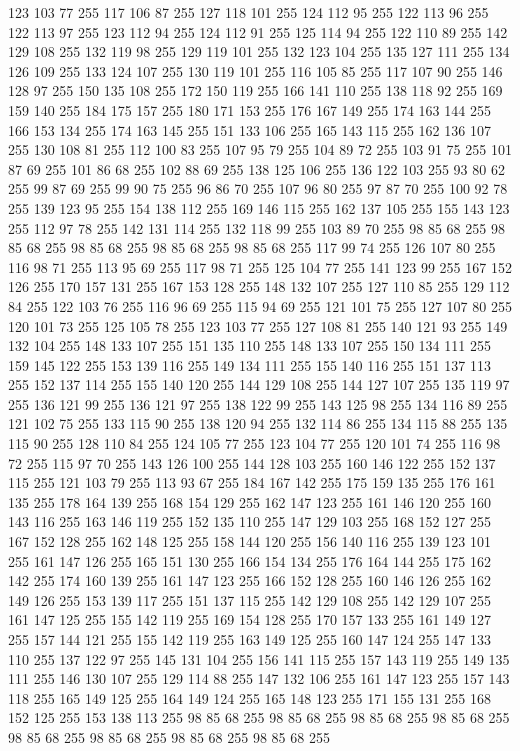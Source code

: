 123 103 77 255 117 106 87 255 127 118 101 255 124 112 95 255 122 113 96 255 122 113 97 255 123 112 94 255 124 112 91 255 125 114 94 255 122 110 89 255 142 129 108 255 132 119 98 255 129 119 101 255 132 123 104 255 135 127 111 255 134 126 109 255 133 124 107 255 130 119 101 255 116 105 85 255 117 107 90 255 146 128 97 255 150 135 108 255 172 150 119 255 166 141 110 255 138 118 92 255 169 159 140 255 184 175 157 255 180 171 153 255 176 167 149 255 174 163 144 255 166 153 134 255 174 163 145 255 151 133 106 255 165 143 115 255 162 136 107 255 130 108 81 255 112 100 83 255 107 95 79 255 104 89 72 255 103 91 75 255 101 87 69 255 101 86 68 255 102 88 69 255 138 125 106 255 136 122 103 255 93 80 62 255 99 87 69 255 99 90 75 255 96 86 70 255 107 96 80 255 97 87 70 255 100 92 78 255 139 123 95 255 154 138 112 255 169 146 115 255 162 137 105 255 155 143 123 255 112 97 78 255 142 131 114 255 132 118 99 255 103 89 70 255 98 85 68 255 98 85 68 255 98 85 68 255
98 85 68 255 98 85 68 255 117 99 74 255 126 107 80 255 116 98 71 255 113 95 69 255 117 98 71 255 125 104 77 255 141 123 99 255 167 152 126 255 170 157 131 255 167 153 128 255 148 132 107 255 127 110 85 255 129 112 84 255 122 103 76 255 116 96 69 255 115 94 69 255 121 101 75 255 127 107 80 255 120 101 73 255 125 105 78 255 123 103 77 255 127 108 81 255 140 121 93 255 149 132 104 255 148 133 107 255 151 135 110 255 148 133 107 255 150 134 111 255 159 145 122 255 153 139 116 255 149 134 111 255 155 140 116 255 151 137 113 255 152 137 114 255 155 140 120 255 144 129 108 255 144 127 107 255 135 119 97 255 136 121 99 255 136 121 97 255 138 122 99 255 143 125 98 255 134 116 89 255 121 102 75 255 133 115 90 255 138 120 94 255 132 114 86 255 134 115 88 255 135 115 90 255 128 110 84 255 124 105 77 255 123 104 77 255 120 101 74 255 116 98 72 255 115 97 70 255 143 126 100 255 144 128 103 255 160 146 122 255 152 137 115 255 121 103 79 255 113 93 67 255 184 167 142 255
175 159 135 255 176 161 135 255 178 164 139 255 168 154 129 255 162 147 123 255 161 146 120 255 160 143 116 255 163 146 119 255 152 135 110 255 147 129 103 255 168 152 127 255 167 152 128 255 162 148 125 255 158 144 120 255 156 140 116 255 139 123 101 255 161 147 126 255 165 151 130 255 166 154 134 255 176 164 144 255 175 162 142 255 174 160 139 255 161 147 123 255 166 152 128 255 160 146 126 255 162 149 126 255 153 139 117 255 151 137 115 255 142 129 108 255 142 129 107 255 161 147 125 255 155 142 119 255 169 154 128 255 170 157 133 255 161 149 127 255 157 144 121 255 155 142 119 255 163 149 125 255 160 147 124 255 147 133 110 255 137 122 97 255 145 131 104 255 156 141 115 255 157 143 119 255 149 135 111 255 146 130 107 255 129 114 88 255 147 132 106 255 161 147 123 255 157 143 118 255 165 149 125 255 164 149 124 255 165 148 123 255 171 155 131 255 168 152 125 255 153 138 113 255 98 85 68 255 98 85 68 255 98 85 68 255 98 85 68 255 98 85 68 255 98 85 68 255 98 85 68 255 98 85 68 255
